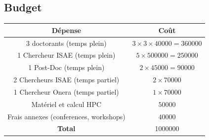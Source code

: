 \documentclass[french]{article}
\begin{document}
\subsection{Budget}
\begin{center}
\begin{tabular}{|c|c|}
	\hline
	D\'epense & Co\^{u}t \\
	\hline
	3 doctorants (temps plein) & $3\times 3\times 40000=360000$  \\
	1 Chercheur ISAE (temps plein) & $5\times 500000=250000$ \\
	1 Post-Doc (temps plein) & $2\times 45000=90000$ \\
	2 Chercheurs ISAE (temps partiel)& $2\times 70000$ \\
	1 Chercheur Onera (temps partiel)& $1\times 70000$ \\
	Matériel  et calcul HPC & $50000$ \\
	Frais annexes (conferences, workshops) & $40000$ \\
	\hline
	\textbf{Total} & 1000000 \\
	\hline
\end{tabular}
\end{center}



\footnotesize


\end{document}
